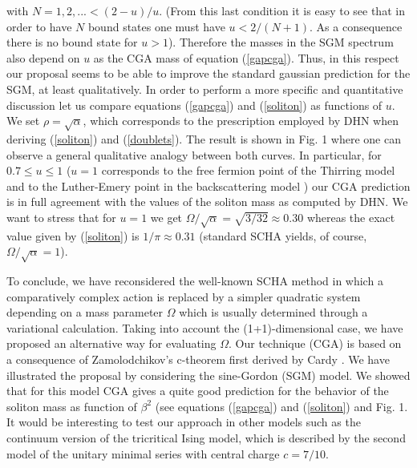 \documentclass[a4paper,12pt]{article}
\begin{document}
\noindent with $N=1,2,...<(2-u)/u$. (From this last condition it is easy to see that
in order to have $N$ bound states one must have $u<2/(N+1)$. As a consequence there is
no bound state for $u>1$). Therefore the masses in the SGM spectrum also depend on $u$
as the CGA mass of equation (\ref{gapcga}). Thus, in this respect our proposal seems
to be able to improve the standard gaussian prediction for the SGM, at least
qualitatively. In order to perform a more specific and quantitative  discussion let us
compare equations (\ref{gapcga}) and (\ref{soliton}) as functions of $u$. We set
$\rho=\sqrt{\alpha}$, which corresponds to the prescription employed by DHN when
deriving (\ref{soliton}) and (\ref{doublets}). The result is shown in Fig. 1 where one
can observe a general qualitative analogy between both curves. In particular, for
$0.7\leq u \leq 1$ ($u=1$ corresponds to the free fermion point of the Thirring model
and to the Luther-Emery point in the backscattering model \cite{Luther-Emery}) our CGA
prediction is in full agreement with the values of the soliton mass as computed by
DHN. We want to stress that for $u=1$ we get
$\Omega/\sqrt{\alpha}=\sqrt{3/32}\approx0.30$ whereas the exact value given by
(\ref{soliton}) is $1/\pi\approx0.31$ (standard SCHA yields, of course,
$\Omega/\sqrt{\alpha}=1$).


\vspace{1cm} To conclude, we have reconsidered the well-known SCHA method in which a
comparatively complex action is replaced by a simpler quadratic system depending on a
mass parameter $\Omega$ which is usually determined through a variational calculation.
Taking into account the (1+1)-dimensional case, we have proposed an alternative way
for evaluating $\Omega$. Our technique (CGA) is based on a consequence of
Zamolodchikov's \cite{Zamolodchikov} c-theorem first derived by Cardy \cite{Cardy}. We
have illustrated the proposal by considering the sine-Gordon (SGM) model. We showed
that for this model CGA gives a quite good prediction for the behavior of the soliton
mass as function of $\beta^2$ (see equations (\ref{gapcga}) and (\ref{soliton}) and
Fig. 1. It would be interesting to test our approach in other models such as the
continuum version of the tricritical Ising model, which is described by the second
model of the unitary minimal series \cite{BPZ} \cite{FQS} with central charge
$c=7/10$. \vspace{0.5cm}
\end{document}
